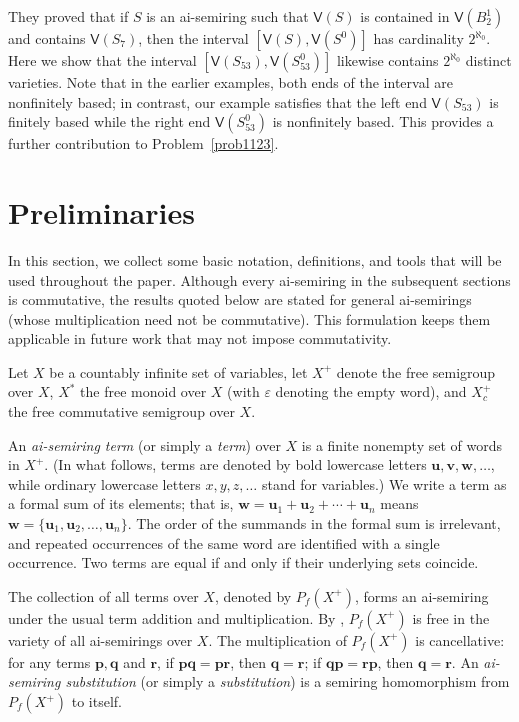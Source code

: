 \documentclass[reqno]{amsart}
\theoremstyle{plain}
\theoremstyle{definition}
\newcommand{\bp}{\mathbf{p}}
\newcommand{\bq}{\mathbf{q}}
\newcommand{\br}{\mathbf{r}}
\newcommand{\bu}{\mathbf{u}}
\newcommand{\bw}{\mathbf{w}}
\begin{document}
They proved that if $S$ is an ai-semiring such that
$\mathsf{V}(S)$ is contained in $\mathsf{V}(B_2^1)$ and contains $\mathsf{V}(S_7)$,
then the interval $[\mathsf{V}(S), \mathsf{V}(S^0)]$ has cardinality $2^{\aleph_0}$.
Here we show that the interval $[\mathsf{V}(S_{53}), \mathsf{V}(S_{53}^0)]$ likewise contains $2^{\aleph_0}$ distinct varieties.
Note that in the earlier examples, both ends of the interval are nonfinitely based;
in contrast,
our example satisfies that the left end $\mathsf{V}(S_{53})$
is finitely based while the right end $\mathsf{V}(S_{53}^0)$ is nonfinitely based.
This provides a further contribution to Problem~\ref{prob1123}.

\section{Preliminaries}
In this section, we collect some basic notation, definitions, and tools that will be used throughout the paper.
Although every ai-semiring in the subsequent sections is commutative,
the results quoted below are stated for general ai-semirings (whose multiplication need not be commutative).
This formulation keeps them applicable in future work that may not impose commutativity.

Let $X$ be a countably infinite set of variables,
let $X^+$ denote the free semigroup over $X$,
$X^*$ the free monoid over $X$ (with $\varepsilon$ denoting the empty word),
and $X_c^+$ the free commutative semigroup over $X$.

An \emph{ai-semiring term} (or simply a \emph{term}) over $X$ is a finite nonempty set of words in $X^+$.
(In what follows, terms are denoted by bold lowercase letters \(\mathbf{u}, \mathbf{v}, \mathbf{w}, \dots\),
while ordinary lowercase letters \(x, y, z, \dots\) stand for variables.)
We write a term as a formal sum of its elements; that is,
$\bw=\bu_1+\bu_2+\cdots+\bu_n$ means $\bw=\{\bu_1, \bu_2, \ldots, \bu_n\}$.
The order of the summands in the formal sum is irrelevant,
and repeated occurrences of the same word are identified with a single occurrence.
Two terms are equal if and only if their underlying sets coincide.

The collection of all terms over $X$, denoted by $P_f(X^+)$,
forms an ai-semiring under the usual term addition and multiplication.
By \cite[Theorem 2.5]{kp}, $P_f(X^+)$ is free in the variety of all ai-semirings over $X$.
The multiplication of $P_f(X^+)$ is cancellative: for any terms $\bp, \bq$ and $\br$, if $\bp\bq=\bp\br$, then $\bq=\br$;
if $\bq\bp=\br\bp$, then $\bq=\br$.
An \emph{ai-semiring substitution} (or simply a \emph{substitution}) is a semiring homomorphism from $P_f(X^+)$ to itself.
\end{document}
